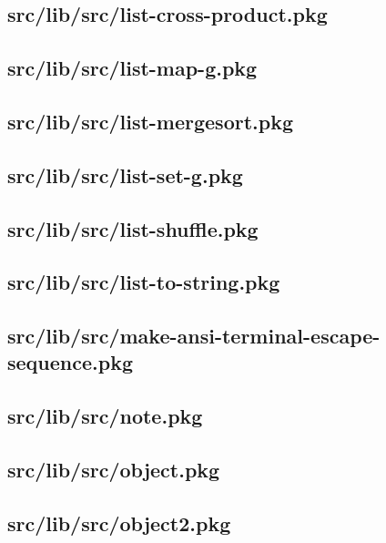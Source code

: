 \subsection{src/lib/src/list-cross-product.pkg}


\subsection{src/lib/src/list-map-g.pkg}


\subsection{src/lib/src/list-mergesort.pkg}


\subsection{src/lib/src/list-set-g.pkg}


\subsection{src/lib/src/list-shuffle.pkg}


\subsection{src/lib/src/list-to-string.pkg}


\subsection{src/lib/src/make-ansi-terminal-escape-sequence.pkg}


\subsection{src/lib/src/note.pkg}


\subsection{src/lib/src/object.pkg}


\subsection{src/lib/src/object2.pkg}


